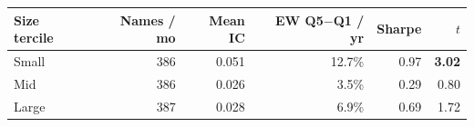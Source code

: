\begin{tabular}{lrrrrr}
\toprule
Size tercile & Names / mo & Mean IC & EW Q5$-$Q1 / yr & Sharpe & $t$ \\
\midrule
Small & 386 & 0.051 & 12.7\% & 0.97 & \textbf{3.02} \\
Mid & 386 & 0.026 & 3.5\% & 0.29 & 0.80 \\
Large & 387 & 0.028 & 6.9\% & 0.69 & 1.72 \\
\bottomrule
\end{tabular}
